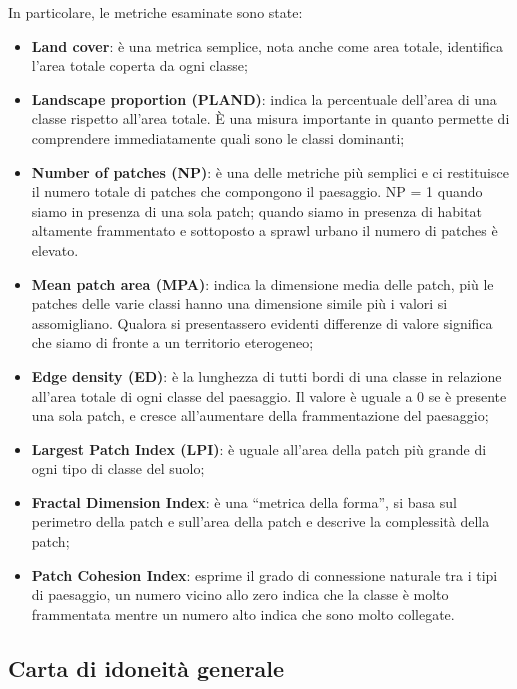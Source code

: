 \documentclass[
]{book}
\providecommand{\tightlist}{%
  \setlength{\itemsep}{0pt}\setlength{\parskip}{0pt}}
\begin{document}
In particolare, le metriche esaminate sono state:

\begin{itemize}
\tightlist
\item
  \textbf{Land cover}: è una metrica semplice, nota anche come area totale, identifica l'area totale coperta da ogni classe;
\item
  \textbf{Landscape proportion (PLAND)}: indica la percentuale dell'area di una classe rispetto all'area totale. È una misura importante in quanto permette di comprendere immediatamente quali sono le classi dominanti;
\item
  \textbf{Number of patches (NP)}: è una delle metriche più semplici e ci restituisce il numero totale di patches che compongono il paesaggio. NP = 1 quando siamo in presenza di una sola patch; quando siamo in presenza di habitat altamente frammentato e sottoposto a sprawl urbano il numero di patches è elevato.
\item
  \textbf{Mean patch area (MPA)}: indica la dimensione media delle patch, più le patches delle varie classi hanno una dimensione simile più i valori si assomigliano. Qualora si presentassero evidenti differenze di valore significa che siamo di fronte a un territorio eterogeneo;
\item
  \textbf{Edge density (ED)}: è la lunghezza di tutti bordi di una classe in relazione all'area totale di ogni classe del paesaggio. Il valore è uguale a 0 se è presente una sola patch, e cresce all'aumentare della frammentazione del paesaggio;
\item
  \textbf{Largest Patch Index (LPI)}: è uguale all'area della patch più grande di ogni tipo di classe del suolo;
\item
  \textbf{Fractal Dimension Index}: è una ``metrica della forma'', si basa sul perimetro della patch e sull'area della patch e descrive la complessità della patch;
\item
  \textbf{Patch Cohesion Index}: esprime il grado di connessione naturale tra i tipi di paesaggio, un numero vicino allo zero indica che la classe è molto frammentata mentre un numero alto indica che sono molto collegate.
\end{itemize}

\subsection{Carta di idoneità generale}\label{carta-di-idoneituxe0-generale}
\end{document}
